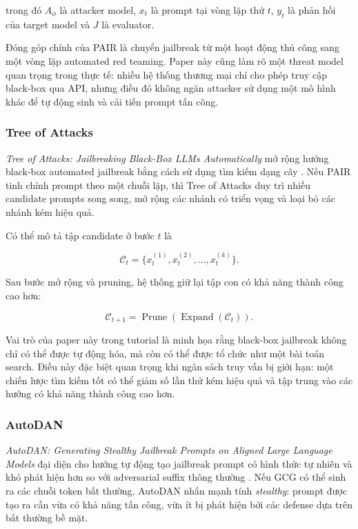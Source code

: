 trong đó $A_{\phi}$ là attacker model, $x_t$ là prompt tại vòng lặp thứ
$t$, $y_t$ là phản hồi của target model và $J$ là evaluator.

Đóng góp chính của PAIR là chuyển jailbreak từ một hoạt động thủ công sang
một vòng lặp automated red teaming. Paper này cũng làm rõ một threat model
quan trọng trong thực tế: nhiều hệ thống thương mại chỉ cho phép truy cập
black-box qua API, nhưng điều đó không ngăn attacker sử dụng một mô hình
khác để tự động sinh và cải tiến prompt tấn công.

\subsubsection{Tree of Attacks}

\textit{Tree of Attacks: Jailbreaking Black-Box LLMs Automatically} mở
rộng hướng black-box automated jailbreak bằng cách sử dụng tìm kiếm dạng
cây \cite{mehrotra2023tap}. Nếu PAIR tinh chỉnh prompt theo một chuỗi lặp,
thì Tree of Attacks duy trì nhiều candidate prompts song song, mở rộng các
nhánh có triển vọng và loại bỏ các nhánh kém hiệu quả.

Có thể mô tả tập candidate ở bước $t$ là

\begin{equation}
    \mathcal{C}_t
    =
    \{x_t^{(1)}, x_t^{(2)}, \ldots, x_t^{(k)}\}.
    \label{eq:chapter7-tap-candidates}
\end{equation}

Sau bước mở rộng và pruning, hệ thống giữ lại tập con có khả năng thành
công cao hơn:

\begin{equation}
    \mathcal{C}_{t+1}
    =
    \operatorname{Prune}
    \left(
        \operatorname{Expand}(\mathcal{C}_t)
    \right).
    \label{eq:chapter7-tap-expand-prune}
\end{equation}

Vai trò của paper này trong tutorial là minh họa rằng black-box jailbreak
không chỉ có thể được tự động hóa, mà còn có thể được tổ chức như một bài
toán search. Điều này đặc biệt quan trọng khi ngân sách truy vấn bị giới
hạn: một chiến lược tìm kiếm tốt có thể giảm số lần thử kém hiệu quả và
tập trung vào các hướng có khả năng thành công cao hơn.

\subsubsection{AutoDAN}

\textit{AutoDAN: Generating Stealthy Jailbreak Prompts on Aligned Large
Language Models} đại diện cho hướng tự động tạo jailbreak prompt có hình
thức tự nhiên và khó phát hiện hơn so với adversarial suffix thông thường
\cite{liu2023autodan}. Nếu GCG có thể sinh ra các chuỗi token bất thường,
AutoDAN nhấn mạnh tính \textit{stealthy}: prompt được tạo ra cần vừa có khả
năng tấn công, vừa ít bị phát hiện bởi các defense dựa trên bất thường bề
mặt.


